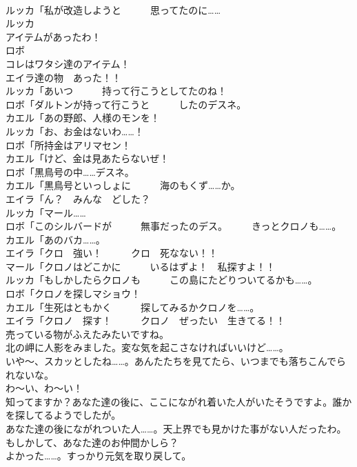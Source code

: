 \documentclass[8pt]{extreport}
\begin{document}
\begin{CJK}{UTF8}{min}
\\	ルッカ「私が改造しようと　　　思ってたのに……	
\\	ルッカ
\\	アイテムがあったわ！	
\\	ロボ
\\	コレはワタシ達のアイテム！	
\\	エイラ達の物　あった！！	
\\	ルッカ「あいつ　　　持って行こうとしてたのね！	
\\	ロボ「ダルトンが持って行こうと　　　したのデスネ。	
\\	カエル「あの野郎、人様のモンを！	
\\	ルッカ「お、お金はないわ……！	
\\	ロボ「所持金はアリマセン！	
\\	カエル「けど、金は見あたらないぜ！	
\\	ロボ「黒鳥号の中……デスネ。	
\\	カエル「黒鳥号といっしょに　　　海のもくず……か。	
\\	エイラ「ん？　みんな　どした？	
\\	ルッカ「マール……	
\\	ロボ「このシルバードが　　　無事だったのデス。　　　きっとクロノも……。	
\\	カエル「あのバカ……。	
\\	エイラ「クロ　強い！　　　クロ　死なない！！	
\\	マール「クロノはどこかに　　　いるはずよ！　私探すよ！！	
\\	ルッカ「もしかしたらクロノも　　　この島にたどりついてるかも……。	
\\	ロボ「クロノを探しマショウ！	
\\	カエル「生死はともかく　　　探してみるかクロノを……。	
\\	エイラ「クロノ　探す！　　　クロノ　ぜったい　生きてる！！	
\\	売っている物がふえたみたいですね。	
\\	北の岬に人影をみました。変な気を起こさなければいいけど……。	
\\	いや～、スカッとしたね……。あんたたちを見てたら、いつまでも落ちこんでられないな。	
\\	わ～い、わ～い！	
\\	知ってますか？あなた達の後に、ここにながれ着いた人がいたそうですよ。誰かを探してるようでしたが。	
\\	あなた達の後にながれついた人……。天上界でも見かけた事がない人だったわ。もしかして、あなた達のお仲間かしら？ 
\\	よかった……。すっかり元気を取り戻して。	

\end{CJK}
\end{document}
